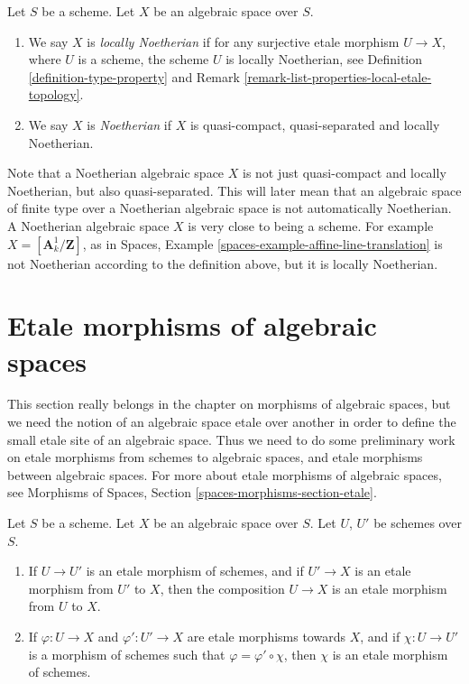 \begin{definition}
\label{definition-noetherian}
Let $S$ be a scheme. Let $X$ be an algebraic space over $S$.
\begin{enumerate}
\item We say $X$ is {\it locally Noetherian} if for any surjective etale
morphism $U \to X$, where $U$ is a scheme, the scheme $U$ is
locally Noetherian, see
Definition \ref{definition-type-property} and
Remark \ref{remark-list-properties-local-etale-topology}.
\item We say $X$ is {\it Noetherian}
if $X$ is quasi-compact, quasi-separated and locally Noetherian.
\end{enumerate}
\end{definition}

\noindent
Note that a Noetherian algebraic space $X$ is not just quasi-compact
and locally Noetherian, but also quasi-separated. This will later mean
that an algebraic space of finite type over a Noetherian algebraic space
is not automatically Noetherian.
A Noetherian algebraic space $X$ is very close to being a scheme.
For example $X = [\mathbf{A}^1_k/\mathbf{Z}]$,
as in Spaces, Example \ref{spaces-example-affine-line-translation} is
not Noetherian according to the definition above, but it is locally
Noetherian.




\section{Etale morphisms of algebraic spaces}
\label{section-etale-morphisms}

\noindent
This section really belongs in the chapter on morphisms of algebraic
spaces, but we need the notion of an algebraic space etale over another
in order to define the small etale site of an algebraic space.
Thus we need to do some preliminary work on etale morphisms from schemes to
algebraic spaces, and etale morphisms between algebraic spaces.
For more about etale morphisms of algebraic spaces, see
Morphisms of Spaces, Section \ref{spaces-morphisms-section-etale}.

\begin{lemma}
\label{lemma-etale-over-space}
Let $S$ be a scheme.
Let $X$ be an algebraic space over $S$.
Let $U$, $U'$ be schemes over $S$.
\begin{enumerate}
\item If $U \to U'$ is an etale morphism of schemes, and
if $U' \to X$ is an etale morphism from $U'$ to $X$, then the
composition $U \to X$ is an etale morphism from $U$ to $X$.
\item If $\varphi : U \to X$ and $\varphi' : U' \to X$ are
etale morphisms towards $X$, and if $\chi : U \to U'$ is a
morphism of schemes such that $\varphi = \varphi' \circ \chi$,
then $\chi$ is an etale morphism of schemes.
\end{enumerate}
\end{lemma}

